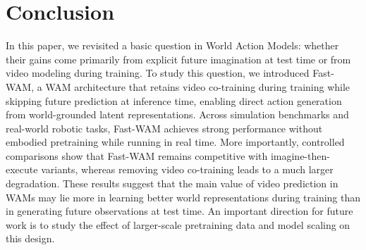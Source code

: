 \section{Conclusion}

In this paper, we revisited a basic question in World Action Models: whether their gains come primarily from explicit future imagination at test time or from video modeling during training. To study this question, we introduced Fast-WAM, a WAM architecture that retains video co-training during training while skipping future prediction at inference time, enabling direct action generation from world-grounded latent representations.
Across simulation benchmarks and real-world robotic tasks, Fast-WAM achieves strong performance without embodied pretraining while running in real time. More importantly, controlled comparisons show that Fast-WAM remains competitive with imagine-then-execute variants, whereas removing video co-training leads to a much larger degradation. These results suggest that the main value of video prediction in WAMs may lie more in learning better world representations during training than in generating future observations at test time.
An important direction for future work is to study the effect of larger-scale pretraining data and model scaling on this design.